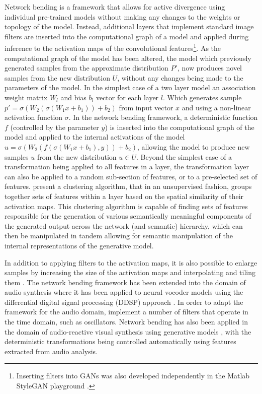 Network bending \citep{broad2021network} is a framework that allows for active divergence using individual pre-trained models without making any changes to the weights or topology of the model. 
Instead, additional layers that implement standard image filters are inserted into the computational graph of a model and applied during inference to the activation maps of the convolutional features\footnote{
    Inserting filters into GANs was also developed independently in the Matlab StyleGAN playground \citep{pinkney2020matlab}.}. 
As the computational graph of the model has been altered, the model which previously generated samples from the approximate distribution $P'$, now produces novel samples from the new distribution $U$, without any changes being made to the parameters of the model. 
In the simplest case of a two layer model an association weight matrix $W_l$ and bias $b_l$ vector for each layer $l$. 
Which generates sample $p'=\sigma(W_2(\sigma(W_1x+b_1))+b_2)$ from input vector $x$ and using a non-linear activation function $\sigma$. 
In the network bending framework, a deterministic function $f$ (controlled by the parameter $y$) is inserted into the computational graph of the model and applied to the internal activations of the model $u=\sigma(W_2(f(\sigma(W_1x+b_1),y))+b_2)$, allowing the model to produce new samples $u$ from the new distribution $u \in U$. Beyond the simplest case of a transformation being applied to all features in a layer, the transformation layer can also be applied to a random sub-section of features, or to a pre-selected set of features. 
\citet{broad2021network} present a clustering algorithm, that in an unsupervised fashion, groups together sets of features within a layer based on the spatial similarity of their activation maps. 
This clustering algorithm is capable of finding sets of features responsible for the generation of various semantically meaningful components of the generated output across the network (and semantic) hierarchy, which can then be manipulated in tandem allowing for semantic manipulation of the internal representations of the generative model. 

In addition to applying filters to the activation maps, it is also possible to enlarge samples by increasing the size of the activation maps and interpolating and tiling them \citep{pouliot2020gan}. 
The network bending framework has been extended into the domain of audio synthesis \citep{mccallum2020network} where it has been applied to neural vocoder models using the differential digital signal processing (DDSP) approach \citep{engel2020ddsp}. 
In order to adapt the framework for the audio domain, \citet{mccallum2020network} implement a number of filters that operate in the time domain, such as oscillators. Network bending has also been applied in the domain of audio-reactive visual synthesis using generative models \citep{brouwer2020audio}, with the deterministic transformations being controlled automatically using features extracted from audio analysis.

